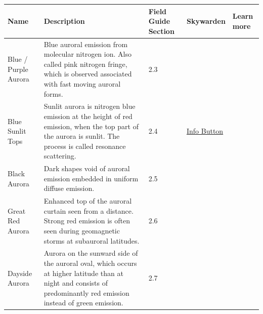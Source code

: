 \documentclass{article}
\begin{document}
\begin{longtable}{|p{1.5cm}|p{6.5cm}|p{1cm}|p{1.75cm}|p{1.8cm}|}
\hline
\textbf{Name} & \textbf{Description} & \textbf{Field Guide Section} & \textbf{Skywarden} & \textbf{Learn more} \\
\hline
\endfirsthead
\endfoot
\hline
\endlastfoot

Blue / Purple Aurora & Blue auroral emission from molecular nitrogen ion. Also called pink nitrogen fringe, which is observed associated with fast moving auroral forms. & 2.3 &  &  \\
\hline
Blue Sunlit Tops & Sunlit aurora is nitrogen blue emission at the height of red emission, when the top part of the aurora is sunlit. The process is called resonance scattering. & 2.4 & \href{https://www.taivaanvahti.fi/observations/info/428/en}{Info Button} & \textcite{Shiokawa2019} \\
\hline
Black Aurora & Dark shapes void of auroral emission embedded in uniform diffuse emission. & 2.5 &  & \textcite{Trondsen1997} \\
\hline
Great Red Aurora & Enhanced top of the auroral curtain seen from a distance. Strong red emission is often seen during geomagnetic storms at subauroral latitudes. & 2.6 &  &  \\
\hline
Dayside Aurora & Aurora on the sunward side of the auroral oval, which occurs at higher latitude than at night and consists of predominantly red emission instead of green emission. & 2.7 &  & \textcite{Frey2019} \\
\hline


\end{longtable}
\end{document}
